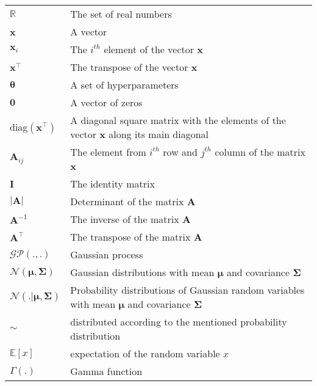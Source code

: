 \begin{table}[!htbp]
    {\renewcommand{\arraystretch}{1.5}
    \begin{tabularx}{0.99\textwidth}{ l| X }
      $\mathbb{R}$ & The set of real numbers \\
      \textbf{x} & A vector \\
      $\textbf{x}_{i}$ & The $i^{th}$ element of the vector \textbf{x} \\
      $\textbf{x}^\top$ & The transpose of the vector \textbf{x} \\
      $\boldsymbol{\theta}$ & A set of hyperparameters \\
      $\textbf{0}$ & A vector of zeros \\
      diag$\left(\textbf{x}^\top\right)$ & A diagonal square matrix with the elements of the vector \textbf{x} along its main diagonal \\
      $\textbf{A}_{ij}$ & The element from $i^{th}$ row and $j^{th}$ column of the matrix \textbf{x} \\
      $\textbf{I}$ & The identity matrix \\ 
      $|\textbf{A}|$ & Determinant of the matrix \textbf{A} \\
      $\textbf{A}^{-1}$ & The inverse of the matrix \textbf{A} \\
      $\textbf{A}^\top$ & The transpose of the matrix \textbf{A} \\     
      $\mathcal{GP}\left(.,.\right)$ & Gaussian process \\
      $\mathcal{N}\left(\boldsymbol{\mu},\boldsymbol{\Sigma}\right)$ & Gaussian distributions with mean $\boldsymbol{\mu}$ and covariance $\boldsymbol{\Sigma}$ \\
      $\mathcal{N}\left(.|\boldsymbol{\mu},\boldsymbol{\Sigma}\right)$ & Probability distributions of Gaussian random variables with mean $\boldsymbol{\mu}$ and covariance $\boldsymbol{\Sigma}$ \\
      $\sim$ & distributed according to the mentioned probability distribution \\
      $\mathbb{E}\left[x\right]$ & expectation of the random variable $x$ \\
      $\Gamma\left(.\right)$ & Gamma function \\
    \end{tabularx}
    }
\end{table}

